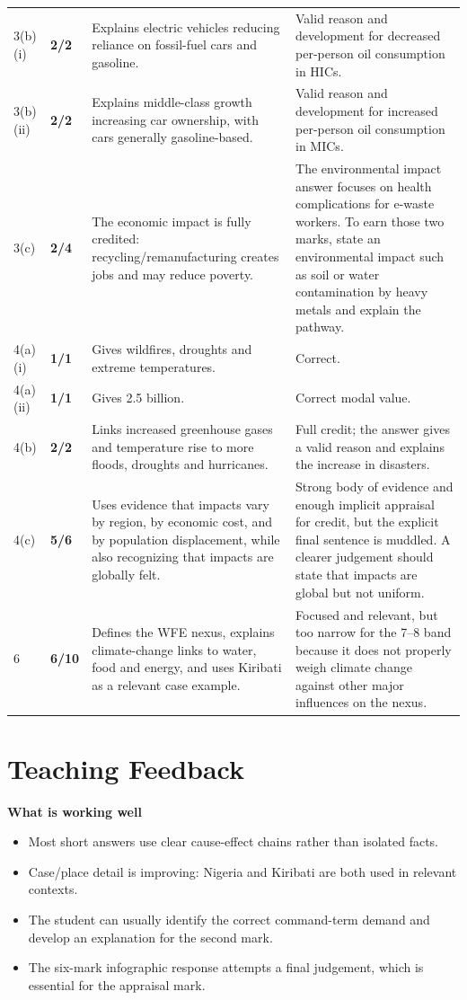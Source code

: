 \documentclass[11pt]{article}
\newcommand{\markcell}[2]{\textbf{#1/#2}}
\begin{document}
\begin{longtable}{@{}p{} p{} p{} p{}@{}}
3(b)(i) & \markcell{2}{2} & Explains electric vehicles reducing reliance on fossil-fuel cars and gasoline. & Valid reason and development for decreased per-person oil consumption in HICs. \\
3(b)(ii) & \markcell{2}{2} & Explains middle-class growth increasing car ownership, with cars generally gasoline-based. & Valid reason and development for increased per-person oil consumption in MICs. \\
3(c) & \markcell{2}{4} & The economic impact is fully credited: recycling/remanufacturing creates jobs and may reduce poverty. & The environmental impact answer focuses on health complications for e-waste workers. To earn those two marks, state an environmental impact such as soil or water contamination by heavy metals and explain the pathway. \\
\midrule
4(a)(i) & \markcell{1}{1} & Gives wildfires, droughts and extreme temperatures. & Correct. \\
4(a)(ii) & \markcell{1}{1} & Gives 2.5 billion. & Correct modal value. \\
4(b) & \markcell{2}{2} & Links increased greenhouse gases and temperature rise to more floods, droughts and hurricanes. & Full credit; the answer gives a valid reason and explains the increase in disasters. \\
4(c) & \markcell{5}{6} & Uses evidence that impacts vary by region, by economic cost, and by population displacement, while also recognizing that impacts are globally felt. & Strong body of evidence and enough implicit appraisal for credit, but the explicit final sentence is muddled. A clearer judgement should state that impacts are global but not uniform. \\
\midrule
6 & \markcell{6}{10} & Defines the WFE nexus, explains climate-change links to water, food and energy, and uses Kiribati as a relevant case example. & Focused and relevant, but too narrow for the 7--8 band because it does not properly weigh climate change against other major influences on the nexus. \\
\bottomrule
\end{longtable}

\section*{Teaching Feedback}

\textbf{What is working well}
\begin{itemize}
  \item Most short answers use clear cause-effect chains rather than isolated facts.
  \item Case/place detail is improving: Nigeria and Kiribati are both used in relevant contexts.
  \item The student can usually identify the correct command-term demand and develop an explanation for the second mark.
  \item The six-mark infographic response attempts a final judgement, which is essential for the appraisal mark.
\end{itemize}
\end{document}
